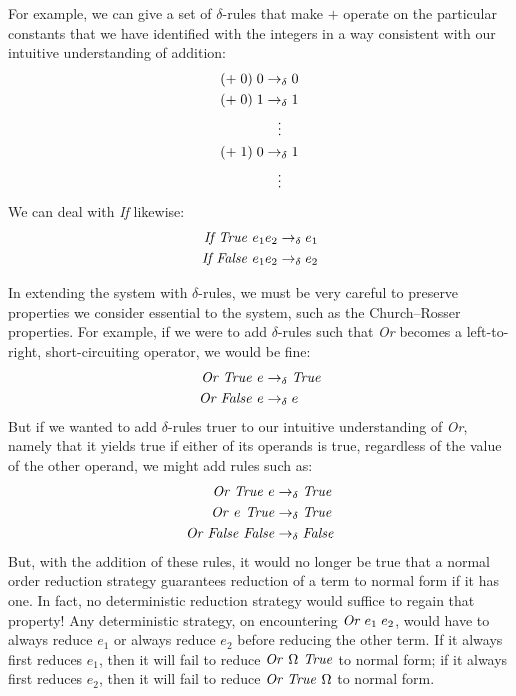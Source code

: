 For example, we can give a set of $\delta$-rules that make $+$ operate on the particular constants that we have identified with the integers in a way consistent with our intuitive understanding of addition:
\begin{align*}
(+\; 0)\; 0 &\dred 0\\
(+\; 0)\; 1 &\dred 1\\
&\hphantom{\rightarrow}\vdots\\
(+\; 1)\; 0 &\dred 1\\
&\hphantom{\rightarrow}\vdots
\end{align*}
We can deal with \textit{If} likewise:
\begin{align*}
\const{If True } e_{1} e_{2} &\dred e_{1}\\
\const{If False } e_{1} e_{2} &\dred e_{2}
\end{align*}

In extending the system with $\delta$-rules, we must be very careful to preserve properties we consider essential to the system, such as the Church--Rosser properties. For example, if we were to add $\delta$-rules such that \textit{Or} becomes a left-to-right, short-circuiting operator, we would be fine:
\begin{align*}
\const{Or True } e &\dred \const{True}\\
\const{Or False } e &\dred e
\end{align*}
But if we wanted to add $\delta$-rules truer to our intuitive understanding of \textit{Or}, namely that it yields true if either of its operands is true, regardless of the value of the other operand, we might add rules such as:
\begin{align*}
\const{Or True } e &\dred \const{True}\\
\const{Or } e \const{ True} &\dred \const{True}\\
\const{Or False False} &\dred \const{False}
\end{align*}
But, with the addition of these rules, it would no longer be true that a normal order reduction strategy guarantees reduction of a term to normal form if it has one. In fact, no deterministic reduction strategy would suffice to regain that property! Any deterministic strategy, on encountering $\text{\textit{Or}}\; e_{1}\; e_{2}$, would have to always reduce $e_{1}$ or always reduce $e_{2}$ before reducing the other term. If it always first reduces $e_{1}$, then it will fail to reduce $\text{\textit{Or }} \Omega \text{\textit{ True}}$ to normal form; if it always first reduces $e_{2}$, then it will fail to reduce $\text{\textit{Or True }} \Omega$ to normal form.

